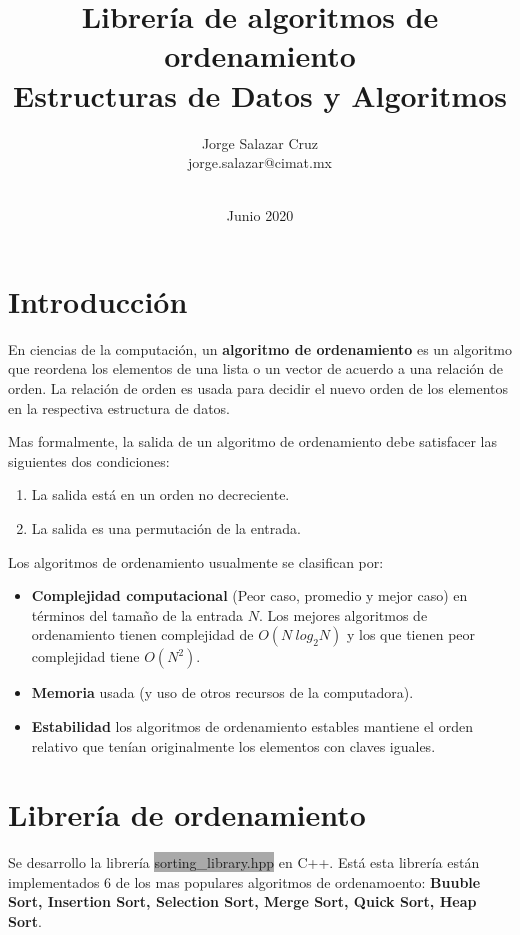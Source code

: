 \documentclass[letterpaper, 12pt]{article}
\title{Librería de algoritmos de ordenamiento \\ 
Estructuras de Datos y Algoritmos}
\author{Jorge Salazar Cruz \\
    jorge.salazar@cimat.mx\\ \\
  \multicolumn{1}{p{.7\textwidth}}{\centering\emph{
  Universidad de Guanajuato}}}
\date{Junio 2020}
\begin{document}
\maketitle

\section{Introducción}
En ciencias de la computación, un \textbf{algoritmo de ordenamiento} es un algoritmo que reordena los elementos de una lista o un vector de acuerdo a una relación de orden. La relación de orden es usada para decidir el nuevo orden de los elementos en la respectiva estructura de datos. 

Mas formalmente, la salida de un algoritmo de ordenamiento debe satisfacer las siguientes dos condiciones:
\begin{enumerate}
    \item La salida está en un orden no decreciente.
    \item La salida es una permutación de la entrada.
\end{enumerate}

Los algoritmos de ordenamiento usualmente se clasifican por:

\begin{itemize}
    \item \textbf{Complejidad computacional} (Peor caso, promedio y mejor caso) en términos del tamaño de la entrada $N$. Los mejores algoritmos de ordenamiento tienen complejidad de $O(N\ log_2 N)$ y los que tienen peor complejidad tiene $O(N^2)$.
    
    \item \textbf{Memoria} usada (y uso de otros recursos de la computadora). 
    
    \item \textbf{Estabilidad} los algoritmos de ordenamiento estables mantiene el orden relativo que tenían originalmente los elementos con claves iguales.
\end{itemize}




\section{Librería de ordenamiento}
Se desarrollo la librería \colorbox{darkgray}{sorting\_library.hpp} en C++. Está esta librería están implementados 6 de los mas populares algoritmos de ordenamoento: \textbf{Buuble Sort, Insertion Sort, Selection Sort, Merge Sort, Quick Sort, Heap Sort}. 



\end{document}

